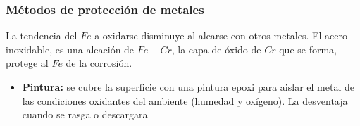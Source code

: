     \subsubsection{Métodos de protección de metales}
    \sangria{} La tendencia del $Fe$ a oxidarse disminuye al alearse con otros metales. El acero inoxidable, es una aleación de $Fe-Cr$, la capa de óxido de $Cr$ que se forma, protege al $Fe$ de la corrosión.
    \begin{itemize}
        \item \textbf{Pintura:} se cubre la superficie con una pintura epoxi para aislar el metal de las condiciones oxidantes del ambiente (humedad y oxígeno). La desventaja cuando se rasga o descargara 
    \end{itemize}
